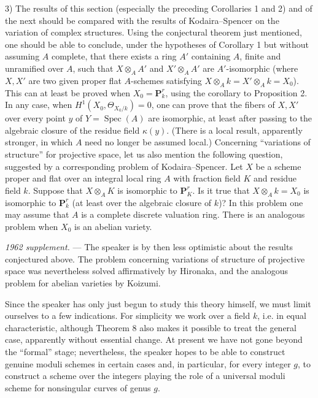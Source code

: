 3) The results of this section (especially the preceding Corollaries 1 and 2)
and of the next should be compared with the results of Kodaira--Spencer on the
variation of complex structures. Using the conjectural theorem just mentioned,
one should be able to conclude, under the hypotheses of Corollary 1 but without
assuming $A$ complete, that there exists a ring $A'$ containing $A$, finite and
unramified over $A$, such that $X\otimes_A A'$ and $X'\otimes_A A'$ are
$A'$-isomorphic (where $X,X'$ are two given proper flat $A$-schemes satisfying
$X\otimes_A k=X'\otimes_A k=X_0$). This can at least be proved when
$X_0=\mathbf P_k^r$, using the corollary to Proposition 2. In any case, when
$H^1(X_0,\Theta_{X_0/k})=0$, one can prove that the fibers of $X,X'$ over every
point $y$ of $Y=\operatorname{Spec}(A)$ are isomorphic, at least after passing
to the algebraic closure of the residue field $\kappa(y)$. (There is a local
result, apparently stronger, in which $A$ need no longer be assumed local.)
Concerning “variations of structure” for projective space, let us also mention
the following question, suggested by a corresponding problem of
Kodaira--Spencer. Let $X$ be a scheme proper and flat over an integral local
ring $A$ with fraction field $K$ and residue field $k$. Suppose that
$X\otimes_A K$ is isomorphic to $\mathbf P_K^r$. Is it true that
$X\otimes_A k=X_0$ is isomorphic to $\mathbf P_k^r$ (at least over the
algebraic closure of $k$)? In this problem one may assume that $A$ is a
complete discrete valuation ring. There is an analogous problem when $X_0$ is
an abelian variety.

\emph{1962 supplement.} --- The speaker is by then less optimistic about the
results conjectured above. The problem concerning variations of structure of
projective space was nevertheless solved affirmatively by Hironaka, and the
analogous problem for abelian varieties by Koizumi.


Since the speaker has only just begun to study this theory himself, we must
limit ourselves to a few indications. For simplicity we work over a field
$k$, i.e. in equal characteristic, although Theorem 8 also makes it possible
to treat the general case, apparently without essential change. At present we
have not gone beyond the “formal” stage; nevertheless, the speaker hopes to be
able to construct genuine moduli schemes in certain cases and, in particular,
for every integer $g$, to construct a scheme over the integers playing the
role of a universal moduli scheme for nonsingular curves of genus $g$.

